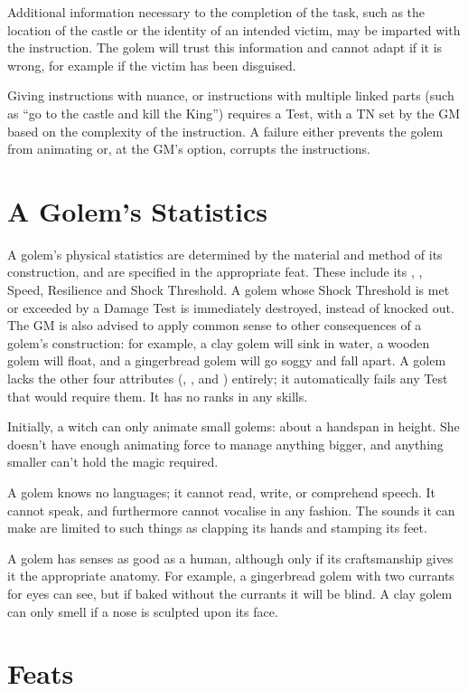 Additional information necessary to the completion of the task, such as the location of the castle or the identity of an intended victim, may be imparted with the instruction.
The golem will trust this information and cannot adapt if it is wrong, for example if the victim has been disguised.

Giving instructions with nuance, or instructions with multiple linked parts (such as ``go to the castle and kill the King'') requires a Test, with a TN set by the GM based on the complexity of the instruction.
A failure either prevents the golem from animating or, at the GM's option, corrupts the instructions.

\section{A Golem's Statistics}

A golem's physical statistics are determined by the material and method of its construction, and are specified in the appropriate feat.
These include its , , Speed, Resilience and Shock Threshold.
A golem whose Shock Threshold is met or exceeded by a Damage Test is immediately destroyed, instead of knocked out.
The GM is also advised to apply common sense to other consequences of a golem's construction: for example, a clay golem will sink in water, a wooden golem will float, and a gingerbread golem will go soggy and fall apart.
A golem lacks the other four attributes (, ,  and ) entirely; it automatically fails any Test that would require them.
It has no ranks in any skills.

Initially, a witch can only animate small golems: about a handspan in height.
She doesn't have enough animating force to manage anything bigger, and anything smaller can't hold the magic required.

A golem knows no languages; it cannot read, write, or comprehend speech.
It cannot speak, and furthermore cannot vocalise in any fashion.
The sounds it can make are limited to such things as clapping its hands and stamping its feet.

A golem has senses as good as a human, although only if its craftsmanship gives it the appropriate anatomy.
For example, a gingerbread golem with two currants for eyes can see, but if baked without the currants it will be blind.
A clay golem can only smell if a nose is sculpted upon its face.

\section{Feats}

